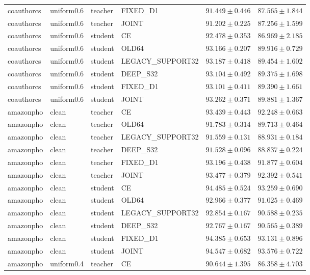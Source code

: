 \begin{longtable}{llllrr}
coauthorcs & uniform0.6 & teacher & FIXED\_D1 & $91.449 \pm 0.446$ & $87.565 \pm 1.844$ \\
coauthorcs & uniform0.6 & teacher & JOINT & $91.202 \pm 0.225$ & $87.256 \pm 1.599$ \\
coauthorcs & uniform0.6 & student & CE & $92.478 \pm 0.353$ & $86.969 \pm 2.185$ \\
coauthorcs & uniform0.6 & student & OLD64 & $93.166 \pm 0.207$ & $89.916 \pm 0.729$ \\
coauthorcs & uniform0.6 & student & LEGACY\_SUPPORT32 & $93.187 \pm 0.418$ & $89.454 \pm 1.602$ \\
coauthorcs & uniform0.6 & student & DEEP\_S32 & $93.104 \pm 0.492$ & $89.375 \pm 1.698$ \\
coauthorcs & uniform0.6 & student & FIXED\_D1 & $93.101 \pm 0.411$ & $89.390 \pm 1.661$ \\
coauthorcs & uniform0.6 & student & JOINT & $93.262 \pm 0.371$ & $89.881 \pm 1.367$ \\
amazonpho & clean & teacher & CE & $93.439 \pm 0.443$ & $92.248 \pm 0.663$ \\
amazonpho & clean & teacher & OLD64 & $91.783 \pm 0.314$ & $89.713 \pm 0.464$ \\
amazonpho & clean & teacher & LEGACY\_SUPPORT32 & $91.559 \pm 0.131$ & $88.931 \pm 0.184$ \\
amazonpho & clean & teacher & DEEP\_S32 & $91.528 \pm 0.096$ & $88.837 \pm 0.224$ \\
amazonpho & clean & teacher & FIXED\_D1 & $93.196 \pm 0.438$ & $91.877 \pm 0.604$ \\
amazonpho & clean & teacher & JOINT & $93.477 \pm 0.379$ & $92.392 \pm 0.541$ \\
amazonpho & clean & student & CE & $94.485 \pm 0.524$ & $93.259 \pm 0.690$ \\
amazonpho & clean & student & OLD64 & $92.966 \pm 0.377$ & $91.025 \pm 0.469$ \\
amazonpho & clean & student & LEGACY\_SUPPORT32 & $92.854 \pm 0.167$ & $90.588 \pm 0.235$ \\
amazonpho & clean & student & DEEP\_S32 & $92.767 \pm 0.167$ & $90.565 \pm 0.389$ \\
amazonpho & clean & student & FIXED\_D1 & $94.385 \pm 0.653$ & $93.131 \pm 0.896$ \\
amazonpho & clean & student & JOINT & $94.547 \pm 0.682$ & $93.576 \pm 0.722$ \\
amazonpho & uniform0.4 & teacher & CE & $90.644 \pm 1.395$ & $86.358 \pm 4.703$ \\

\end{longtable}
